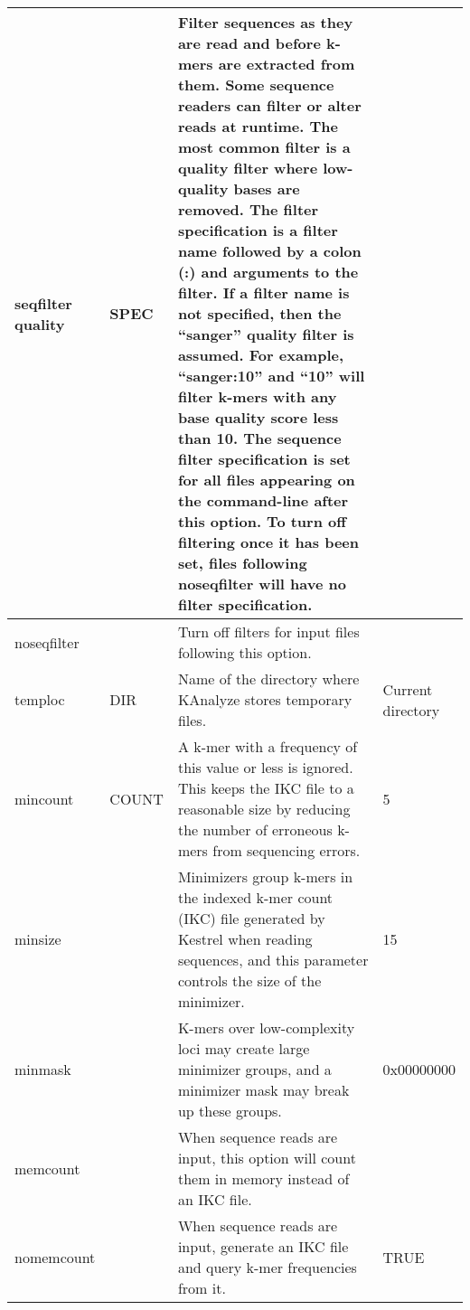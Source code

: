 \begin{small}
\begin{longtable}{|p{\optwidth}|p{\argwidth}|p{\dscwidth}|p{}|}
		\optbox{\ddash{}seqfilter\\\ddash{}quality} & SPEC &
		Filter sequences as they are read and before k-mers are extracted from them. Some sequence readers can filter or alter reads at runtime. The most common filter is a quality filter where low-quality bases are removed. The filter specification is a filter name followed by a colon (:) and arguments to the filter. If a filter name is not specified, then the ``sanger'' quality filter is assumed. For example, ``sanger:10'' and ``10'' will filter k-mers with any base quality score less than 10. The sequence filter specification is set for all files appearing on the command-line after this option. To turn off filtering once it has been set, files following \ddash{}noseqfilter will have no filter specification.
		&
		\\ \hline
		
		\ddash{}noseqfilter & &
		Turn off filters for input files following this option.
		&
		\\ \hline
		
		\ddash{}temploc & DIR &
		Name of the directory where KAnalyze stores temporary files.
		& \parbox{2cm}{Current\\directory}
		\\ \hline
		
		\ddash{}mincount & COUNT &
		A k-mer with a frequency of this value or less is ignored. This keeps the IKC file to a reasonable size by reducing the number of erroneous k-mers from sequencing errors.
		& 5
		\\ \hline
		
		\ddash{}minsize & &
		Minimizers group k-mers in the indexed k-mer count (IKC) file generated by Kestrel when reading sequences, and this parameter controls the size of the minimizer.
		& 15
		\\ \hline
		
		\ddash{}minmask & &
		K-mers over low-complexity loci may create large minimizer groups, and a minimizer mask may break up these groups.
		& 0x00000000
		\\ \hline
		
		\ddash{}memcount & &
		When sequence reads are input, this option will count them in memory instead of an IKC file.
		&
		\\ \hline
		
		\ddash{}nomemcount & &
		When sequence reads are input, generate an IKC file and query k-mer frequencies from it.
		& TRUE
		\\ \hline
		

\end{longtable}
\end{small}
